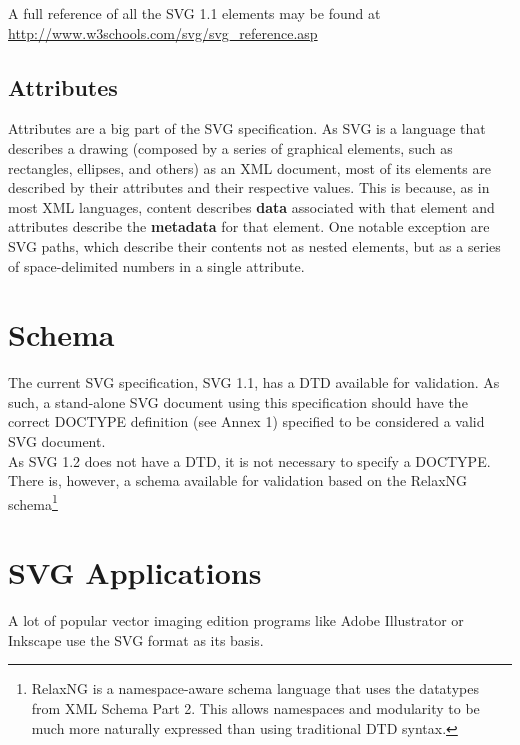 \documentclass[twocolumn,twoside,10pt,a4paper]{article}
\begin{document}
A full reference of all the SVG 1.1 elements may be found at \url{http://www.w3schools.com/svg/svg_reference.asp}


\subsection{Attributes}

Attributes are a big part of the SVG specification. As SVG is a language that describes a drawing (composed by a series of graphical elements, such as rectangles, ellipses, and others) as an XML document, most of its elements are described by their attributes and their respective values. This is because, as in most XML languages, content describes \textbf{data} associated with that element and attributes describe the \textbf{metadata} for that element. One notable exception are SVG paths, which describe their contents not as nested elements, but as a series of space-delimited numbers in a single attribute.\cite{ibm_xml}

\section{Schema}

The current SVG specification, SVG 1.1, has a DTD available for validation. As such, a stand-alone SVG document using this specification should have the correct DOCTYPE definition (see Annex 1) specified to be considered a valid SVG document.\\

As SVG 1.2 does not have a DTD\cite{svg_no_dtd}, it is not necessary to specify a DOCTYPE. There is, however, a schema available for validation based on the RelaxNG schema\footnote{RelaxNG is a namespace-aware schema language that uses the datatypes from XML Schema Part 2. This allows namespaces and modularity to be much more naturally expressed than using traditional DTD syntax.}

\section{SVG Applications}

A lot of popular vector imaging edition programs like Adobe Illustrator or Inkscape use the SVG format as its basis.\\
\end{document}

